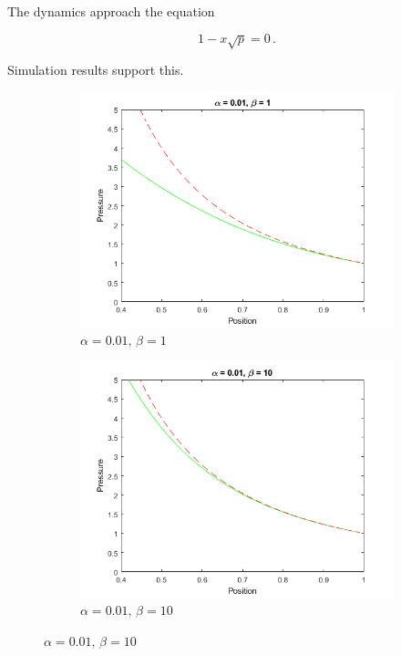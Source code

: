 The dynamics approach the equation

\begin{equation*}
    1 - x \sqrt{p} = 0 \, .
\end{equation*}

Simulation results support this. 

\begin{figure}[ht]
    \centering
    \begin{subfigure}{0.49\textwidth}
    \includegraphics[width=\textwidth]{Figures/LowFlow/b=1.png}
    \caption{$\alpha = 0.01, \, \beta = 1$}
    \end{subfigure}
    \begin{subfigure}{0.49\textwidth}
    \includegraphics[width=\textwidth]{Figures/LowFlow/b=10.png}
    \caption{$\alpha = 0.01, \, \beta = 10$}
    \end{subfigure}
\end{figure}

